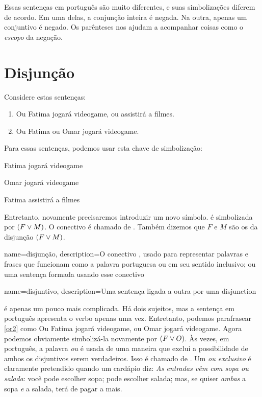 Essas sentenças em português são muito diferentes, e suas simbolizações
diferem de acordo. Em uma delas, a conjunção inteira é negada. Na outra,
apenas um conjuntivo é negado. Os parênteses nos ajudam a acompanhar
coisas como o \emph{escopo} da negação.

\section{Disjunção}

Considere estas sentenças:
	\begin{enumerate}
		\item\label{or1}Ou Fatima jogará videogame, ou assistirá a filmes.
		\item\label{or2}Ou Fatima ou Omar jogará videogame.
	\end{enumerate}
Para essas sentenças, podemos usar esta chave de simbolização:
	\begin{ekey}
		\item[F] Fatima jogará videogame
		\item[O] Omar jogará videogame
		\item[M] Fatima assistirá a filmes
	\end{ekey}
Entretanto, novamente precisaremos introduzir um novo símbolo.
 é simbolizada por $(F \vee M)$. O conectivo é chamado de
. Também dizemos que $F$ e $M$ são os
 da disjunção $(F \vee M)$.

{
name=disjunção,
description={O conectivo \eor, usado para representar palavras e frases que funcionam como a palavra portuguesa ou em seu sentido inclusivo; ou uma sentença formada usando esse conectivo}
}

{
name=disjuntivo,
description={Uma sentença ligada a outra por uma \gls{disjunction}}
}

 é apenas um pouco mais complicada. Há dois sujeitos, mas a
sentença em português apresenta o verbo apenas uma vez. Entretanto,
podemos parafrasear \cref*{or2} como Ou Fatima jogará videogame, ou Omar
jogará videogame. Agora podemos obviamente simbolizá-la novamente por
$(F \vee O)$.
Às vezes, em português, a palavra \emph{ou} é usada de uma maneira que
exclui a possibilidade de ambos os disjuntivos serem verdadeiros. Isso é
chamado de . Um \emph{ou exclusivo} é claramente
pretendido quando um cardápio diz: \emph{As entradas vêm com sopa ou
salada}: você pode escolher sopa; pode escolher salada; mas, se quiser
\emph{ambas} a sopa \emph{e} a salada, terá de pagar a mais.

